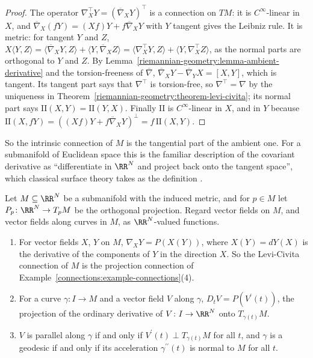 \begin{proof}
The operator $\nabla^\top_XY = (\overline{\nabla}_XY)^\top$ is a connection on $TM$: it is $C^\infty$-linear in $X$, and
$\overline{\nabla}_X(fY) = (Xf)Y + f\overline{\nabla}_XY$ with $Y$ tangent gives the Leibniz rule. It is metric: for tangent $Y$ and $Z$,
$X\langle Y, Z\rangle = \langle\overline{\nabla}_XY, Z\rangle + \langle Y, \overline{\nabla}_XZ\rangle = \langle\nabla^\top_XY, Z\rangle + \langle Y, \nabla^\top_XZ\rangle$, as the normal parts are orthogonal to
$Y$ and $Z$. By Lemma~\ref{riemannian-geometry:lemma-ambient-derivative} and the torsion-freeness of $\overline{\nabla}$,
$\overline{\nabla}_XY - \overline{\nabla}_YX = [X, Y]$, which is tangent. Its tangent part says that $\nabla^\top$ is torsion-free, so $\nabla^\top = \nabla$ by the uniqueness in
Theorem~\ref{riemannian-geometry:theorem-levi-civita}; its normal part says $\mathrm{II}(X, Y) = \mathrm{II}(Y, X)$. Finally $\mathrm{II}$ is $C^\infty$-linear in $X$, and in $Y$
because $\mathrm{II}(X, fY) = ((Xf)Y + f\overline{\nabla}_XY)^\perp = f\,\mathrm{II}(X, Y)$.
\end{proof}

So the intrinsic connection of $M$ is the tangential part of the ambient one. For a submanifold of Euclidean space this is the familiar description of the covariant derivative as
``differentiate in $\RR^N$ and project back onto the tangent space'', which classical surface theory takes as the definition \cite[Chapter 4]{do-carmo-curves-surfaces}.

\begin{corollary}\label{riemannian-geometry:corollary-tangential-projection}
Let $M \subseteq \RR^N$ be a submanifold with the induced metric, and for $p \in M$ let $P_p \colon \RR^N \to T_pM$ be the orthogonal projection. Regard vector fields on $M$, and vector fields along
curves in $M$, as $\RR^N$-valued functions.
\begin{enumerate}
\item For vector fields $X$, $Y$ on $M$, $\nabla_XY = P(X(Y))$, where $X(Y) = dY(X)$ is the derivative of the components of $Y$ in the direction $X$. So the Levi-Civita connection of $M$ is the
projection connection of Example~\ref{connections:example-connections}(4).
\item For a curve $\gamma \colon I \to M$ and a vector field $V$ along $\gamma$, $D_tV = P(V^{\prime}(t))$, the projection of the ordinary derivative of $V \colon I \to \RR^N$ onto $T_{\gamma(t)}M$.
\item $V$ is parallel along $\gamma$ if and only if $V^{\prime}(t) \perp T_{\gamma(t)}M$ for all $t$, and $\gamma$ is a geodesic if and only if its acceleration $\gamma^{\prime\prime}(t)$ is normal to $M$ for all $t$.
\end{enumerate}
\end{corollary}

